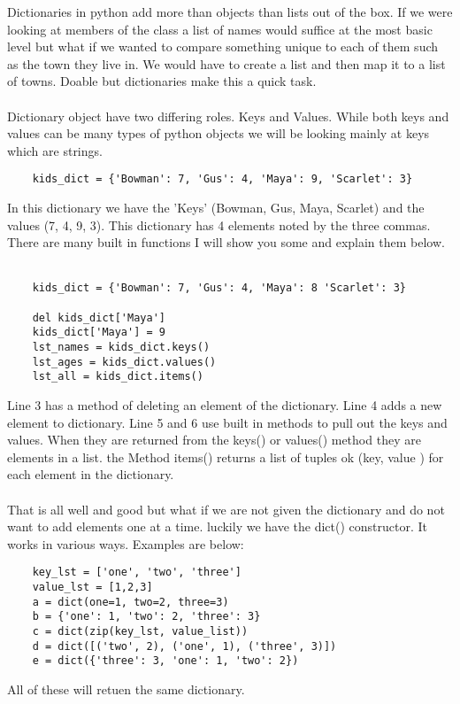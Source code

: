 \documentclass[../main.tex]{subfiles}
\begin{document}
Dictionaries in python add more than objects than lists out of the box. If we were looking at members of the class a list of names would suffice at the most basic level but what if we wanted to compare something unique to each of them such as the town they live in. We would have to create a list and then map it to a list of towns. Doable but dictionaries make this a quick task.\\
\\
Dictionary object have two differing roles. Keys and Values. While both keys and values can be many types of python objects we will be looking mainly at keys which are strings. \\
\begin{verbatim}
    kids_dict = {'Bowman': 7, 'Gus': 4, 'Maya': 9, 'Scarlet': 3}
\end{verbatim}
In this dictionary we have the 'Keys' (Bowman, Gus, Maya, Scarlet) and the values (7, 4, 9, 3). This dictionary has 4 elements noted by the three commas. There are many built in functions I will show you some and explain them below.\\
\\
\begin{lstlisting}
    kids_dict = {'Bowman': 7, 'Gus': 4, 'Maya': 8 'Scarlet': 3}

    del kids_dict['Maya']
    kids_dict['Maya'] = 9
    lst_names = kids_dict.keys()
    lst_ages = kids_dict.values()
    lst_all = kids_dict.items()

\end{lstlisting}
Line 3 has a method of deleting an element of the dictionary. Line 4 adds a new element to dictionary. Line 5 and 6 use built in methods to pull out the keys and values. When they are returned from the keys() or values() method they are elements in a list. the Method items() returns a list of tuples ok (key, value ) for each element in the dictionary. \\
\\
That is all well and good but what if we are not given the dictionary and do not want to add elements one at a time. luckily we have the dict() constructor. It works in various ways. Examples are below:

\begin{lstlisting}
    key_lst = ['one', 'two', 'three']
    value_lst = [1,2,3]
    a = dict(one=1, two=2, three=3)
    b = {'one': 1, 'two': 2, 'three': 3}
    c = dict(zip(key_lst, value_list))
    d = dict([('two', 2), ('one', 1), ('three', 3)])
    e = dict({'three': 3, 'one': 1, 'two': 2})
\end{lstlisting}
All of these will retuen the same dictionary.
\end{document}
